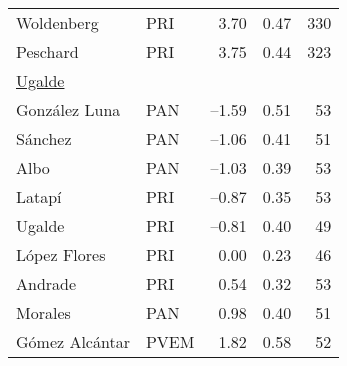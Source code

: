\documentclass[12 pt]{article}
\begin{document}
\begin{table}
\begin{center}
\begin{tabular}{llrrr}
Woldenberg        & PRI &  3.70  &   0.47 & 330\\
Peschard          & PRI &  3.75  &   0.44 & 323\\ [1ex]
\multicolumn{5}{l}{\underline{Ugalde}}         \\ [1.5ex]
Gonz\'alez Luna   & PAN &--1.59  &   0.51 &  53\\
S\'anchez         & PAN &--1.06  &   0.41 &  51\\
Albo              & PAN &--1.03  &   0.39 &  53\\
Latap\'i          & PRI &--0.87  &   0.35 &  53\\
Ugalde            & PRI &--0.81  &   0.40 &  49\\
L\'opez Flores    & PRI &  0.00  &   0.23 &  46\\
Andrade           & PRI &  0.54  &   0.32 &  53\\
Morales           & PAN &  0.98  &   0.40 &  51\\
G\'omez Alc\'antar& PVEM&  1.82  &   0.58 &  52\\ \hline
\end{tabular}
\end{center}
\end{table}
\end{document}
